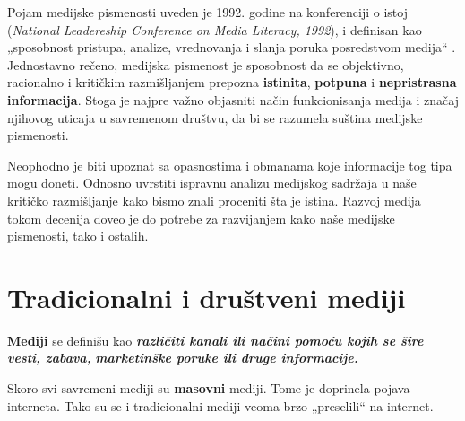 \documentclass[a4paper]{article}
\begin{document}
Pojam medijske pismenosti uveden je 1992. godine na konferenciji o istoj (\emph{National Leadereship Conference on Media Literacy, 1992}), i definisan kao „sposobnost pristupa, analize, vrednovanja i slanja poruka posredstvom medija“ . Jednostavno rečeno, medijska pismenost je sposobnost da se objektivno, racionalno i kritičkim razmišljanjem prepozna \textbf{istinita}, \textbf{potpuna} i \textbf{nepristrasna informacija}.  
Stoga je najpre važno objasniti način funkcionisanja medija i značaj njihovog uticaja u savremenom društvu, da bi se razumela suština medijske pismenosti.

Neophodno je biti upoznat sa opasnostima i obmanama koje informacije tog tipa mogu doneti. Odnosno uvrstiti ispravnu analizu medijskog sadržaja u naše kritičko razmišljanje kako bismo znali proceniti šta je istina. Razvoj medija tokom decenija doveo je do potrebe za razvijanjem kako naše medijske pismenosti, tako i ostalih.

\newpage

\section{Tradicionalni i društveni mediji}

	\textbf{{Mediji}} se definišu kao \emph{\textbf{{različiti kanali ili
			načini pomoću kojih se šire vesti, zabava,}}} \emph{\textbf{{marketinške
			poruke ili druge informacije.}}}

Skoro svi savremeni mediji su \textbf{masovni} mediji. Tome je doprinela
pojava interneta. Tako su se i tradicionalni mediji veoma brzo
„preselili`` na internet.
\end{document}
